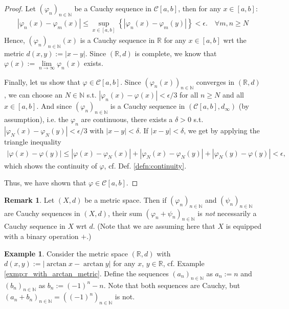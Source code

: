 \documentclass[12pt, a4paper]{article}
\numberwithin{equation}{section}
\theoremstyle{definition}
\theoremstyle{definition}
\newtheorem{exmp}[thm]{Example} %
\newtheorem{remark}[thm]{Remark} %
\newcommand{\abs}[1]{\left\vert #1 \right\vert}
\newcommand{\seq}[1][\varphi]{\left( #1 \right)_{n \in \mathbb{N}}}
\begin{document}
	\begin{proof}
		Let $(\varphi_n)_{n\in\mathbb N}$ be a Cauchy sequence in $\mathcal C[a, b]$, then for any $x\in [a, b]$:
		\begin{align}
			\abs{\varphi_n(x) - \varphi_m(x)} \leq \sup_{x\in [a, b]}\left\{ \abs{\varphi_{n}(x) - \varphi_{m}(y)} \right\} < \epsilon. \quad\forall m, n\geq N
		\end{align} 
		Hence, $(\varphi_n)_{n\in\mathbb N}(x)$ is a Cauchy sequence in $\mathbb R$ for any $x\in[a, b]$ wrt the metric $d(x, y) := \abs{x - y}$. Since $\left(\mathbb R, d\right)$ is complete, we know that $\varphi(x) := \lim\limits_{n\to\infty}\varphi_n(x)$ exists. 
		
		Finally, let us show that $\varphi\in\mathcal C[a, b]$. Since $\left(\varphi_n(x)\right)_{n\in\mathbb N}$ converges in $(\mathbb R, d)$, we can choose an $N\in\mathbb N$ s.t. $\abs{\varphi_n(x) - \varphi(x)} < \epsilon/3$ for all $n\geq N$ and all $x\in[a, b]$. And since $\left(\varphi_n\right)_{n\in\mathbb N}$ is a Cauchy sequence in $(\mathcal C[a, b], d_{\infty})$ (by assumption), i.e. the $\varphi_n$ are continuous, there exists a $\delta > 0$ s.t. $\abs{\varphi_N(x) - \varphi_{N}(y)} < \epsilon/3$ with $\abs{x - y} < \delta$. If $\abs{x-y} < \delta$, we get by applying the triangle inequality
		\begin{align}
			\abs{\varphi(x) - \varphi(y)} \leq \abs{\varphi(x) - \varphi_N(x)} + \abs{\varphi_N(x) - \varphi_N(y)} + \abs{\varphi_N(y) - \varphi(y)} < \epsilon,
		\end{align}
		which shows the continuity of $\varphi$, cf. Def. \ref{defn:continuity}.
		
		Thus, we have shown that $\varphi\in\mathcal C[a, b]$.
	\end{proof}
	
	\begin{remark}
		Let $(X, d)$ be a metric space. Then if $\seq[\varphi_n]$ and $\seq[\psi_n]$ are Cauchy sequences in $(X, d)$, their sum $\seq[\varphi_n + \psi_n]$ is \textit{not} necessarily a Cauchy sequence in $X$ wrt $d$. (Note that we are assuming here that $X$ is equipped with a binary operation $+$.)
	\end{remark}

	\begin{exmp}\label{exmp:counter_exmp_sum_Cauchy_not_Cauchy}
		Consider the metric space $(\mathbb R, d)$ with $d(x, y) := \abs{\arctan x - \arctan y}$ for any $x$, $y\in\mathbb R$, cf. Example \ref{exmp:r_with_arctan_metric}. Define the sequences $\seq[a_n]$ as $a_n := n$ and $\seq[b_n]$ as $b_n := (-1)^n - n$. Note that both sequences are Cauchy, but $\seq[a_n + b_n] = \seq[(-1)^n]$ is not.
	\end{exmp}
\end{document}
